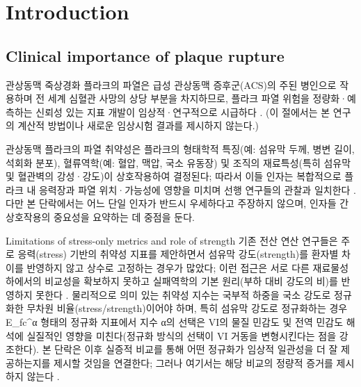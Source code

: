 \documentclass[preprint,12pt]{elsarticle}
\begin{document}
\begin{frontmatter}
\begin{abstract}
본 연구의 목적은, 선행에서 검증된 비용효율적 맥동 FSI 파이프라인을 도구로 사용하여 이상적 관상동맥 플라크 표현형(LAP 및 CP) 전반에 걸쳐 대규모 맥동 FSI 데이터를 생성하고, (i) 임상적 고위험 특성과 일관된 stress/strength 기반 취약성 지수를 정의·선별하며, (ii) Gaussian process surrogate와 Saltelli–Sobol 전역 민감도 분석을 통해 형태·혈류역학·재료 세 인자군의 전역 민감도를 정량화하는 것이다. 본 연구에서는 M1(펄세일 partitioned strong-coupling FSI; Δt=0.5 ms, 1600 step/심주기, 3주기 후 통계 산출)와 M4(6개 후보 VI의 임상 기준에 따른 sign-consistency 선별), M2(ARD Matérn 5/2 GPR surrogate) 및 M3(Sobol S1·ST 산출)을 결합한 3단계 분석(데이터생성→VI선별→대리모델 기반 전역 민감도 분석)을 수행한다; 경계조건·입력 설계공간의 구체적 근거는 데이터셋 및 보조 문서를 따른다.
\end{abstract}
\end{frontmatter}

\section{Introduction}

\subsection{Clinical importance of plaque rupture}
관상동맥 죽상경화 플라크의 파열은 급성 관상동맥 증후군(ACS)의 주된 병인으로 작용하며 전 세계 심혈관 사망의 상당 부분을 차지하므로, 플라크 파열 위험을 정량화·예측하는 신뢰성 있는 지표 개발이 임상적·연구적으로 시급하다 \cite{thomascgasse2005} \cite{nikhiljoshi2013}. (이 절에서는 본 연구의 계산적 방법이나 새로운 임상시험 결과를 제시하지 않는다.)

관상동맥 플라크의 파열 취약성은 플라크의 형태학적 특징(예: 섬유막 두께, 병변 길이, 석회화 분포), 혈류역학(예: 혈압, 맥압, 국소 유동장) 및 조직의 재료특성(특히 섬유막 및 혈관벽의 강성·강도)이 상호작용하여 결정된다; 따라서 이들 인자는 복합적으로 플라크 내 응력장과 파열 위치·가능성에 영향을 미치며 선행 연구들의 관찰과 일치한다 \cite{frankgijsen2019} \cite{claireconway2014} \cite{thomascgasse2005}. 다만 본 단락에서는 어느 단일 인자가 반드시 우세하다고 주장하지 않으며, 인자들 간 상호작용의 중요성을 요약하는 데 중점을 둔다.

Limitations of stress-only metrics and role of strength
기존 전산 연산 연구들은 주로 응력(stress) 기반의 취약성 지표를 제안하면서 섬유막 강도(strength)를 환자별 차이를 반영하지 않고 상수로 고정하는 경우가 많았다; 이런 접근은 서로 다른 재료물성 하에서의 비교성을 확보하지 못하고 실패역학의 기본 원리(부하 대비 강도의 비)를 반영하지 못한다 \cite{thomascgasse2005}. 물리적으로 의미 있는 취약성 지수는 국부적 하중을 국소 강도로 정규화한 무차원 비율(stress/strength)이어야 하며, 특히 섬유막 강도로 정규화하는 경우 E\_fc\textasciicircum α 형태의 정규화 지표에서 지수 α의 선택은 VI의 물질 민감도 및 전역 민감도 해석에 실질적인 영향을 미친다(정규화 방식의 선택이 VI 거동을 변형시킨다는 점을 강조한다). 본 단락은 이후 실증적 비교를 통해 어떤 정규화가 임상적 일관성을 더 잘 제공하는지를 제시할 것임을 연결한다; 그러나 여기서는 해당 비교의 정량적 증거를 제시하지 않는다 \cite{thomascgasse2005}.
\end{document}

